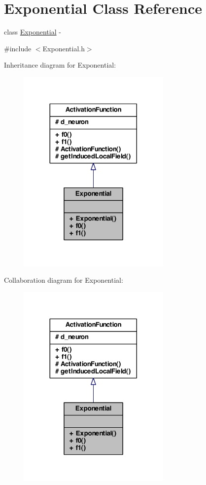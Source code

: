 \hypertarget{class_exponential}{
\section{Exponential Class Reference}
\label{class_exponential}
}


class \hyperlink{class_exponential}{Exponential} -\/  




{\ttfamily \#include $<$Exponential.h$>$}



Inheritance diagram for Exponential:
\nopagebreak
\begin{figure}[H]
\begin{center}
\leavevmode
\includegraphics[width=212pt]{class_exponential__inherit__graph}
\end{center}
\end{figure}


Collaboration diagram for Exponential:
\nopagebreak
\begin{figure}[H]
\begin{center}
\leavevmode
\includegraphics[width=212pt]{class_exponential__coll__graph}
\end{center}
\end{figure}
